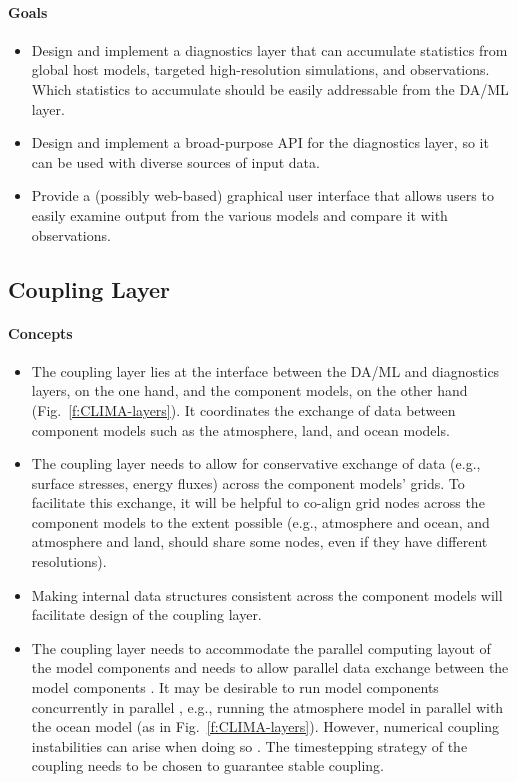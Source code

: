 \documentclass{article}
\begin{document}
\paragraph{Goals}

\begin{itemize}
    \item Design and implement a diagnostics layer that can accumulate statistics from global host models, targeted high-resolution simulations, and observations. Which statistics to accumulate should be easily addressable from the DA/ML layer.
    \item Design and implement a broad-purpose API for the diagnostics layer, so it can be used with diverse sources of input data. 
    \item Provide a (possibly web-based) graphical user interface that allows users to easily examine output from the various models and compare it with observations.
\end{itemize}

\subsection{Coupling Layer}

\paragraph{Concepts}

\begin{itemize}
    \item The coupling layer lies at the interface between the DA/ML and diagnostics layers, on the one hand, and the component models, on the other hand (Fig.~\ref{f:CLIMA-layers}). It coordinates the exchange of data between component models such as the atmosphere, land, and ocean models.  
    \item The coupling layer needs to allow for conservative exchange of data (e.g., surface stresses, energy fluxes) across the component models' grids. To facilitate this exchange, it will be helpful to co-align grid nodes across the component models to the extent possible (e.g., atmosphere and ocean, and atmosphere and land, should share some nodes, even if they have different resolutions).
    \item Making internal data structures consistent across the component models will facilitate design of the coupling layer. 
    \item The coupling layer needs to accommodate the parallel computing layout of the model components and needs to allow parallel data exchange between the model components \citep[e.g.,][]{Larson05a}. It may be desirable to run model components concurrently in parallel \citep{Balaji16a}, e.g., running the atmosphere model in parallel with the ocean model (as in Fig.~\ref{f:CLIMA-layers}). However, numerical coupling instabilities can arise when doing so \citep{Hallberg14a}. The timestepping strategy of the coupling needs to be chosen to guarantee stable coupling. 
\end{itemize}
\end{document}

